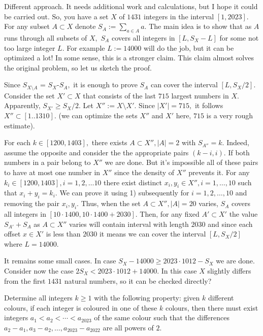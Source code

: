 \begin{solution}[name={Solution by Dragomir Grozev}]
	Different approach. It needs additional work and calculations, but I hope it could be carried out. So, you have a set $X$ of $1431$ integers in the interval $[1,2023]$. For any subset $A\subset X$ denote $S_A:=\sum_{a\in A}a.$
	The main idea is to show that as $A$ runs through all subsets of $X,$ $S_A$ covers all integers in $[L,S_X-L]$ for some not too large integer $L.$ For example $L:=14000$ will do the job, but it can be optimized a lot! In some sense, this is a stronger claim. This claim almost solves the original problem, so let us sketch the proof.
	
	Since $S_{X\setminus A}$ = $S_X$-$S_A,$ it is enough to prove $S_A$ can cover the interval $[L,S_X/2].$ Consider the set $X'\subset X$ that consists of the last $715$ largest numbers in $X.$ Apparently, $S_{X'}\ge S_X/2.$ Let $X'':=X\setminus X'.$ Since $|X'|= 715, $ it follows $X''\subset [1..1310].$ (we can optimize the sets $X''$ and $X'$ here, $715$ is a very rough estimate).
	\begin{tasks}[label=\arabic*]
		\task For each $k\in [1200, 1403],$ there exists $A\subset X'', |A|=2$ with $S_{A''}=k.$ Indeed, assume the opposite and consider the the appropriate pairs $(k-i,i).$ If both numbers in a pair belong to $X''$ we are done. But it's impossible all of these pairs to have at most one number in $X''$ since the density of $X''$ prevents it.
		\task For any $k_i \in [1200, 1403],i=1,2,\dots 10$ there exist distinct $x_i,y_i\in X'',i=1,\dots,10$ such that $x_i+y_i=k_i.$ We can prove it using 1) subsequently for $i=1,2,\dots,10$ and removing the pair $x_i,y_i.$
		\task Thus, when the set $A\subset X'', |A|=20$ varies, $S_A$ covers all integers in $[10\cdot 1400, 10\cdot 1400 + 2030].$ Then, for any fixed $A'\subset X'$ the value $S_{A'}+S_{A}$ as $A\subset X''$ varies will contain interval with length $2030$ and since each offset $x\in X'$ is less than $2030$ it means we can cover the interval $[L,S_X/2]$ where $L=14000$.
	\end{tasks}
	
	It remains some small cases. In case $S_X-14000\ge 2023\cdot 1012 -S_X$ we are done. Consider now the case $2S_X<2023\cdot 1012+14000$. In this case $X$ slightly differs from the first $1431$ natural numbers, so it can be checked directly?
\end{solution}





\begin{question}[name={2023 Benelux, \href{https://artofproblemsolving.com/community/c6h3067009p27675617}{Problem 2}}]
	Determine all integers $k\geqslant 1$ with the following property: given $k$ different colours, if each integer is coloured in one of these $k$ colours, then there must exist integers $a_1<a_2<\cdots<a_{2023}$ of the same colour such that the differences $a_2-a_1,a_3-a_2,\dots,a_{2023}-a_{2022}$ are all powers of $2$.	
\end{question}






